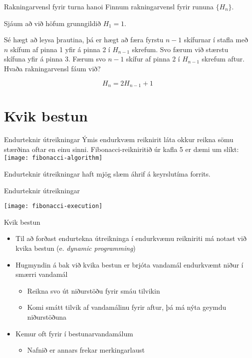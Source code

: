 \documentclass{beamer}
\begin{document}
\begin{frame}{Rakningarvensl fyrir turna hanoi}
Finnum rakningarvensl fyrir rununa $\{H_n\}$. \pause

Sjáum að við höfum grunngildið $H_1 = 1$. \pause

Sé hægt að leysa þrautina, þá er hægt að færa fyrstu $n-1$ skífurnar í stafla með $n$ skífum af pinna 1 yfir á pinna 2 í $H_{n-1}$ skrefum. Svo færum við stærstu skífuna yfir á pinna 3. Færum svo $n-1$ skífur af pinna 2 í $H_{n-1}$ skrefum aftur. Hvaða rakningarvensl fáum við? \pause

\[
 H_n = 2H_{n-1} +1
\]
\end{frame}

\section{Kvik bestun}

\begin{frame}{Endurteknir útreikningar}
Ýmis endurkvæm reiknirit láta okkur reikna sömu stærðina oftar en einu sinni. Fibonacci-reikniritið úr kafla 5 er dæmi um slíkt:
\texttt{[image: fibonacci-algorithm]}

Endurteknir útreikningar haft mjög slæm áhrif á keyrslutíma forrits.
\end{frame}

\begin{frame}{Endurteknir útreikningar}
\begin{center}
\texttt{[image: fibonacci-execution]}
\end{center}
\end{frame}

\begin{frame}{Kvik bestun}
\begin{itemize}
 \item Til að forðast endurtekna útreikninga í endurkvæmu reikniriti má notast við kvika bestun (e. \emph{dynamic programming})
 \item Hugmyndin á bak við kvika bestun er brjóta vandamál endurkvæmt niður í smærri vandamál
 \begin{itemize}
  \item Reikna svo út niðurstöðu fyrir smáu tilvikin
  \item Komi smátt tilvik af vandamálinu fyrir aftur, þá má nýta geymdu niðurstöðuna
 \end{itemize}
 \item Kemur oft fyrir í bestunarvandamálum
 \begin{itemize}
  \item Nafnið er annars frekar merkingarlaust
 \end{itemize}
\end{itemize}
\end{frame}
\end{document}
